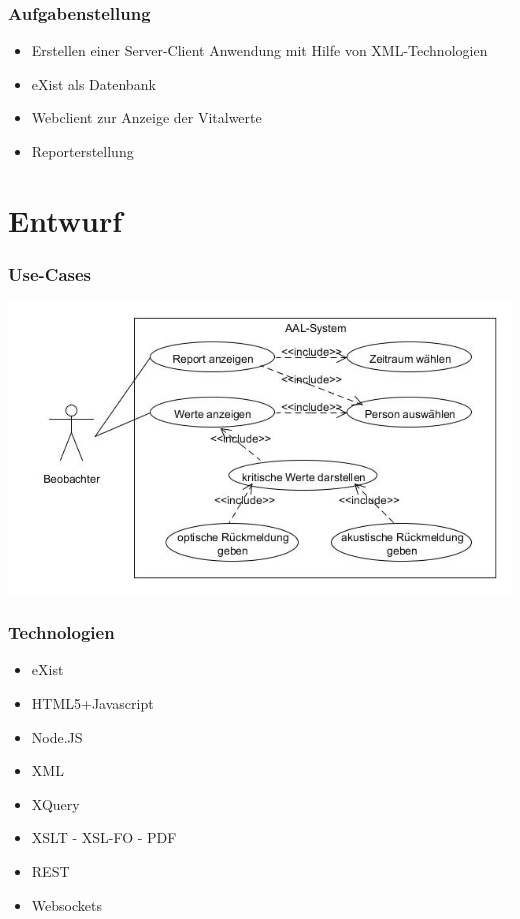 \documentclass{beamer}
\begin{document}
\begin{frame}
\frametitle{Aufgabenstellung}
\begin{itemize}
	\item Erstellen einer Server-Client Anwendung mit Hilfe von XML-Technologien
	\item eXist als Datenbank
	\item Webclient zur Anzeige der Vitalwerte
	\item Reporterstellung
\end{itemize}
\end{frame}

\section{Entwurf}
\begin{frame}
\frametitle{Use-Cases}
\includegraphics[scale=0.5]{images/AAL-Use-Case-Diagramm.jpg} 
\end{frame}

\begin{frame}
\frametitle{Technologien}
\begin{itemize}
	\item eXist
	\item HTML5+Javascript
	\item Node.JS
	\item XML
	\item XQuery
	\item XSLT - XSL-FO - PDF
	\item REST
	\item Websockets
\end{itemize}
\end{frame}
\end{document}
